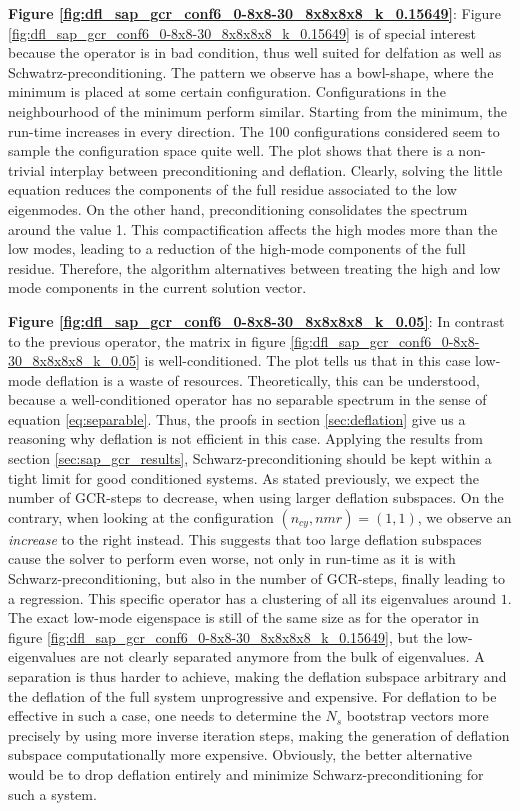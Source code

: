 \documentclass{article}
\theoremstyle{plain} %
\theoremstyle{convention} %
\theoremstyle{remark} %
\numberwithin{equation}{section}
\begin{document}
\textbf{Figure \ref{fig:dfl_sap_gcr_conf6_0-8x8-30_8x8x8x8_k_0.15649}}: Figure \ref{fig:dfl_sap_gcr_conf6_0-8x8-30_8x8x8x8_k_0.15649} is of special interest because the operator is in bad condition, thus well suited for delfation as well as Schwatrz-preconditioning. The pattern we observe has a bowl-shape, where the minimum is placed at some certain configuration. Configurations in the neighbourhood of the minimum perform similar. Starting from the minimum, the run-time increases in every direction. The \num{100} configurations considered seem to sample the configuration space quite well. The plot shows that there is a non-trivial interplay between preconditioning and deflation. Clearly, solving the little equation reduces the components of the full residue associated to the low eigenmodes. On the other hand, preconditioning consolidates the spectrum around the value \num{1}. This compactification affects the high modes more than the low modes, leading to a reduction of the high-mode components of the full residue. Therefore, the algorithm alternatives between treating the high and low mode components in the current solution vector.

\textbf{Figure \ref{fig:dfl_sap_gcr_conf6_0-8x8-30_8x8x8x8_k_0.05}}: In contrast to the previous operator, the matrix in figure \ref{fig:dfl_sap_gcr_conf6_0-8x8-30_8x8x8x8_k_0.05} is well-conditioned. The plot tells us that in this case low-mode deflation is a waste of resources. Theoretically, this can be understood, because a well-conditioned operator has no separable spectrum in the sense of equation \eqref{eq:separable}. Thus, the proofs in section \ref{sec:deflation} give us a reasoning why deflation is not efficient in this case. Applying the results from section \ref{sec:sap_gcr_results}, Schwarz-preconditioning should be kept within a tight limit for good conditioned systems. As stated previously, we expect the number of GCR-steps to decrease, when using larger deflation subspaces. On the contrary, when looking at the configuration $(n_{cy},n{mr}) = (1,1)$, we observe an \textit{increase} to the right instead. This suggests that too large deflation subspaces cause the solver to perform even worse, not only in run-time as it is with Schwarz-preconditioning, but also in the number of GCR-steps, finally leading to a regression. This specific operator has a clustering of all its eigenvalues around $1$. The exact low-mode eigenspace is still of the same size as for the operator in figure \ref{fig:dfl_sap_gcr_conf6_0-8x8-30_8x8x8x8_k_0.15649}, but the low-eigenvalues are not clearly separated anymore from the bulk of eigenvalues. A separation is thus harder to achieve, making the deflation subspace arbitrary and the deflation of the full system unprogressive and expensive. For deflation to be effective in such a case, one needs to determine the $N_s$ bootstrap vectors more precisely by using more inverse iteration steps, making the generation of deflation subspace computationally more expensive. Obviously, the better alternative would be to drop deflation entirely and minimize Schwarz-preconditioning for such a system.
\end{document}
